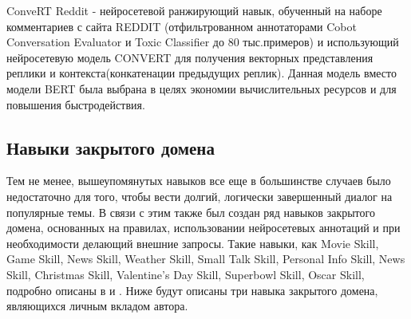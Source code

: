 \begin{table}[htbp]
\centering
\caption {Точность (перплексия) для генеративного навыка}
\label{tab:dream2}%
\end{table}



ConveRT Reddit - нейросетевой ранжирующий навык, обученный на наборе комментариев с сайта REDDIT \cite{na_website_ndu} (отфильтрованном аннотаторами Cobot Conversation Evaluator и Toxic Classifier до 80 тыс.примеров) и использующий нейросетевую модель CONVERT \cite{henderson_2019} для получения векторных представления реплики и контекста(конкатенации предыдущих реплик). Данная модель вместо модели BERT была выбрана в целях экономии вычислительных ресурсов и для повышения быстродействия.

\subsection{Навыки закрытого домена}

Тем не менее, вышеупомянутых навыков все еще в большинстве случаев было недостаточно для того, чтобы вести долгий, логически завершенный диалог на популярные темы. В связи с этим также был создан ряд навыков закрытого домена, основанных на правилах, использовании нейросетевых аннотаций и при необходимости делающий внешние запросы. Такие навыки, как Movie Skill, Game Skill, News Skill, Weather Skill, Small Talk Skill, Personal Info Skill, News Skill, Christmas Skill, Valentine’s Day Skill, Superbowl Skill, Oscar Skill, подробно описаны в \cite{dream1} и \cite{dream1_trudy}. Ниже будут описаны три навыка закрытого домена, являющихся личным вкладом автора.

